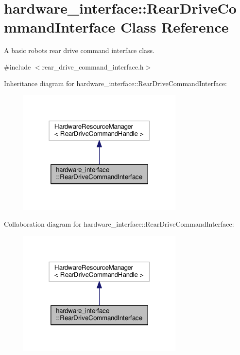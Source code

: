 \hypertarget{classhardware__interface_1_1RearDriveCommandInterface}{}\section{hardware\+\_\+interface\+:\+:Rear\+Drive\+Command\+Interface Class Reference}
\label{classhardware__interface_1_1RearDriveCommandInterface}


A basic robot\textquotesingle{}s rear drive command interface class.  




{\ttfamily \#include $<$rear\+\_\+drive\+\_\+command\+\_\+interface.\+h$>$}



Inheritance diagram for hardware\+\_\+interface\+:\+:Rear\+Drive\+Command\+Interface\+:\nopagebreak
\begin{figure}[H]
\begin{center}
\leavevmode
\includegraphics[width=235pt]{classhardware__interface_1_1RearDriveCommandInterface__inherit__graph}
\end{center}
\end{figure}


Collaboration diagram for hardware\+\_\+interface\+:\+:Rear\+Drive\+Command\+Interface\+:\nopagebreak
\begin{figure}[H]
\begin{center}
\leavevmode
\includegraphics[width=235pt]{classhardware__interface_1_1RearDriveCommandInterface__coll__graph}
\end{center}
\end{figure}


